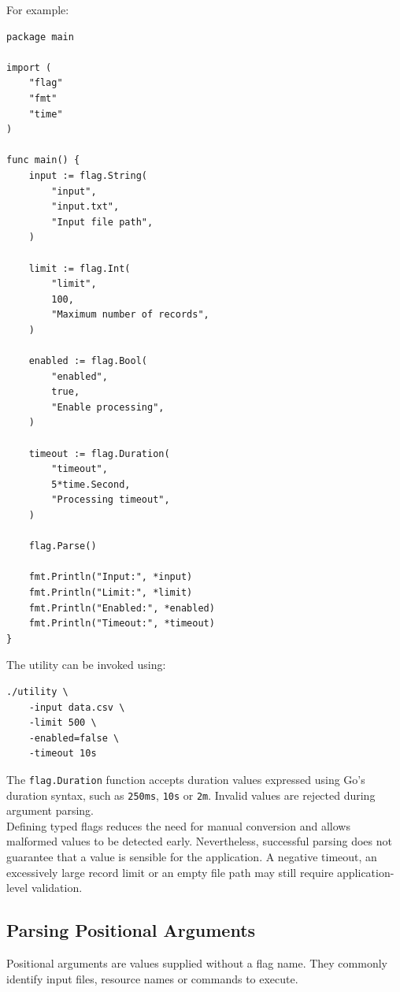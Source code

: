 For example:

\begin{lstlisting}
package main

import (
    "flag"
    "fmt"
    "time"
)

func main() {
    input := flag.String(
        "input",
        "input.txt",
        "Input file path",
    )

    limit := flag.Int(
        "limit",
        100,
        "Maximum number of records",
    )

    enabled := flag.Bool(
        "enabled",
        true,
        "Enable processing",
    )

    timeout := flag.Duration(
        "timeout",
        5*time.Second,
        "Processing timeout",
    )

    flag.Parse()

    fmt.Println("Input:", *input)
    fmt.Println("Limit:", *limit)
    fmt.Println("Enabled:", *enabled)
    fmt.Println("Timeout:", *timeout)
}
\end{lstlisting}

The utility can be invoked using:

\begin{lstlisting}
./utility \
    -input data.csv \
    -limit 500 \
    -enabled=false \
    -timeout 10s
\end{lstlisting}

The \texttt{flag.Duration} function accepts duration values expressed using Go's duration syntax, such as \texttt{250ms}, \texttt{10s} or \texttt{2m}. Invalid values are rejected during argument parsing.\\

Defining typed flags reduces the need for manual conversion and allows malformed values to be detected early. Nevertheless, successful parsing does not guarantee that a value is sensible for the application. A negative timeout, an excessively large record limit or an empty file path may still require application-level validation.\\

\subsection{Parsing Positional Arguments}

Positional arguments are values supplied without a flag name. They commonly identify input files, resource names or commands to execute.\\


